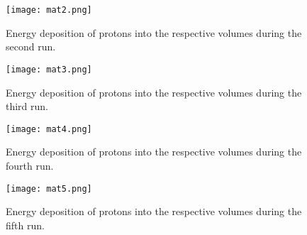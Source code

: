 \documentclass[12pt,twocolumn]{article}
\begin{document}
\begin{figure}[H]
    \centering
    \texttt{[image: mat2.png]}
    \caption{Energy deposition of protons into the respective volumes during the second run.}
    \label{fig:my_label}
\end{figure}

\begin{figure}[H]
    \centering
    \texttt{[image: mat3.png]}
    \caption{Energy deposition of protons into the respective volumes during the third run.}
    \label{fig:my_label}
\end{figure}

\begin{figure}[H]
    \centering
    \texttt{[image: mat4.png]}
    \caption{Energy deposition of protons into the respective volumes during the fourth run.}
    \label{fig:my_label}
\end{figure}

\begin{figure}[H]
    \centering
    \texttt{[image: mat5.png]}
    \caption{Energy deposition of protons into the respective volumes during the fifth run.}
    \label{fig:my_label}
\end{figure}
\end{document}
